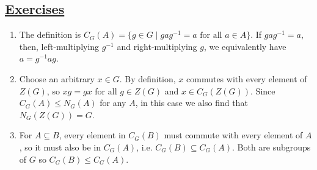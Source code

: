 \documentclass[]{article}
\begin{document}
\subsection*{\underline{Exercises}}
\begin{enumerate}

\item The definition is $C_G(A) = \{ g\in G\mid gag^{-1} = a\text{ for all }a\in A\}$. If $gag^{-1} = a$, then, left-multiplying $g^{-1}$ and right-multiplying $g$, we equivalently have $a = g^{-1}ag$.


\item Choose an arbitrary $x\in G$. By definition, $x$ commutes with every element of $Z(G)$, so $xg = gx$ for all $g \in Z(G)$ and $x \in C_G(Z(G))$. Since $C_G(A) \leq N_G(A)$ for any $A$, in this case we also find that $N_G(Z(G)) = G$.


\item For $A \subseteq B$, every element in $C_G(B)$ must commute with every element of $A$, so it must also be in $C_G(A)$, i.e. $C_G(B) \subseteq C_G(A)$. Both are subgroups of $G$ so $C_G(B) \leq C_G(A)$.



\end{enumerate}
\end{document}
